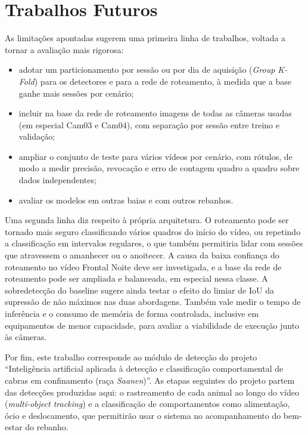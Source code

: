 \section{Trabalhos Futuros}
\label{sec:trabalhos-futuros}

As limitações apontadas sugerem uma primeira linha de trabalhos, voltada a tornar a avaliação mais rigorosa:
\begin{itemize}
    \item adotar um particionamento por sessão ou por dia de aquisição (\textit{Group K-Fold}) para os detectores e para a rede de roteamento, à medida que a base ganhe mais sessões por cenário;
    \item incluir na base da rede de roteamento imagens de todas as câmeras usadas (em especial Cam03 e Cam04), com separação por sessão entre treino e validação;
    \item ampliar o conjunto de teste para vários vídeos por cenário, com rótulos, de modo a medir precisão, revocação e erro de contagem quadro a quadro sobre dados independentes;
    \item avaliar os modelos em outras baias e com outros rebanhos.
\end{itemize}

Uma segunda linha diz respeito à própria arquitetura. O roteamento pode ser tornado mais seguro classificando vários quadros do início do vídeo, ou repetindo a classificação em intervalos regulares, o que também permitiria lidar com sessões que atravessem o amanhecer ou o anoitecer. A causa da baixa confiança do roteamento no vídeo Frontal Noite deve ser investigada, e a base da rede de roteamento pode ser ampliada e balanceada, em especial nessa classe. A sobredetecção do baseline sugere ainda testar o efeito do limiar de IoU da supressão de não máximos nas duas abordagens. Também vale medir o tempo de inferência e o consumo de memória de forma controlada, inclusive em equipamentos de menor capacidade, para avaliar a viabilidade de execução junto às câmeras.

Por fim, este trabalho corresponde ao módulo de detecção do projeto ``Inteligência artificial aplicada à detecção e classificação comportamental de cabras em confinamento (raça \textit{Saanen})''. As etapas seguintes do projeto partem das detecções produzidas aqui: o rastreamento de cada animal ao longo do vídeo (\textit{multi-object tracking}) e a classificação de comportamentos como alimentação, ócio e deslocamento, que permitirão usar o sistema no acompanhamento do bem-estar do rebanho.
